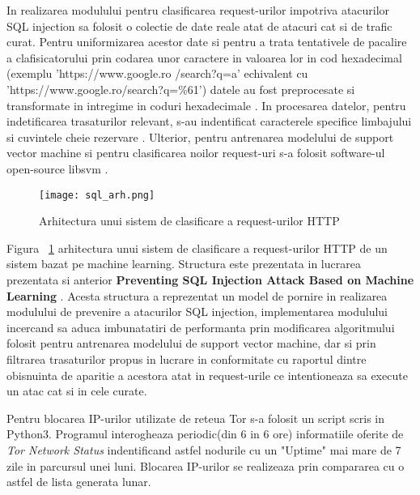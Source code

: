 In realizarea modulului pentru clasificarea request-urilor impotriva atacurilor SQL injection sa folosit o colectie de date reale atat de atacuri cat si de trafic curat. Pentru uniformizarea acestor date si pentru a trata tentativele de pacalire a clafisicatorului prin codarea unor caractere in valoarea lor in cod hexadecimal (exemplu 'https://www.google.ro /search?q=a' echivalent cu 'https://www.google.ro/search?q=\%61') datele au fost preprocesate si transformate in intregime in coduri hexadecimale \cite{ascii}. In procesarea datelor, pentru indetificarea trasaturilor relevant, s-au indentificat caracterele specifice limbajului \cite{char_sql} si cuvintele cheie rezervare \cite{key_sql}. Ulterior, pentru antrenarea modelului de support vector machine si pentru clasificarea noilor request-uri s-a folosit software-ul open-source libsvm \cite{libsvm_class}. 

\begin{figure}[h]
	\centering
	\texttt{[image: sql\_arh.png]}
	\caption{Arhitectura unui sistem de clasificare a request-urilor HTTP}
	\label{fig:sql-arh}
\end{figure}

Figura ~\ref{fig:sql-arh} arhitectura unui sistem de clasificare a request-urilor HTTP de un sistem bazat pe machine learning. Structura este prezentata in lucrarea prezentata si anterior \textbf{Preventing SQL Injection Attack Based on Machine Learning} \cite{sqli_how}. Acesta structura a reprezentat un model de pornire in realizarea modulului de prevenire a atacurilor SQL injection, implementarea modulului incercand sa aduca imbunatatiri de performanta prin modificarea algoritmului folosit pentru antrenarea modelului de support vector machine, dar si prin filtrarea trasaturilor propus in lucrare in conformitate cu raportul dintre obisnuinta de aparitie a acestora atat in request-urile ce intentioneaza sa execute un atac cat si in cele curate.

Pentru blocarea IP-urilor utilizate de reteua Tor s-a folosit un script scris in Python3. Programul interogheaza periodic(din 6 in 6 ore) informatiile oferite de \textit{Tor Network Status} \cite{tot_status} indentificand astfel nodurile cu un "Uptime" mai mare de 7 zile in parcursul unei luni. Blocarea IP-urilor se realizeaza prin compararea cu o astfel de lista generata lunar.


